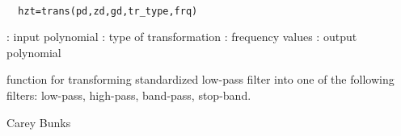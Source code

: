 
\begin{mandesc}
   \\ %
\end{mandesc}
\begin{calling_sequence}
\begin{verbatim}
  hzt=trans(pd,zd,gd,tr_type,frq)  
\end{verbatim}
\end{calling_sequence}
\begin{parameters}
  \begin{varlist}
    : input polynomial
    : type of transformation
    : frequency values
    : output polynomial
  \end{varlist}
\end{parameters}
\begin{mandescription}
  function for transforming standardized low-pass filter into
  one of the following filters:
  low-pass, high-pass, band-pass, stop-band.
\end{mandescription}
\begin{authors}
  Carey Bunks
\end{authors}
